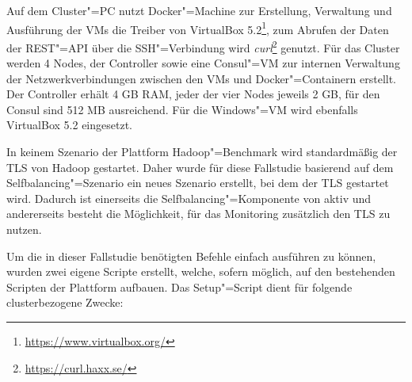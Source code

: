 
Auf dem Cluster"=PC nutzt Docker"=Machine zur Erstellung, Verwaltung und Ausführung der VMs die Treiber von VirtualBox 5.2\footnote{\url{https://www.virtualbox.org/}}, zum Abrufen der Daten der REST"=API über die SSH"=Verbindung wird \emph{curl}\footnote{\url{https://curl.haxx.se/}} genutzt.
Für das Cluster werden 4 Nodes, der Controller sowie eine Consul"=VM zur internen Verwaltung der Netzwerkverbindungen zwischen den VMs und Docker"=Containern erstellt.
Der Controller erhält 4 GB RAM, jeder der vier Nodes jeweils 2 GB, für den Consul sind 512 MB ausreichend.
Für die Windows"=VM wird ebenfalls VirtualBox 5.2 eingesetzt.

In keinem Szenario der Plattform Hadoop"=Benchmark wird standardmäßig der \ac{TLS} von Hadoop gestartet.
Daher wurde für diese Fallstudie basierend auf dem Selfbalancing"=Szenario ein neues Szenario erstellt, bei dem der \ac{TLS} gestartet wird.
Dadurch ist einerseits die Selfbalancing"=Komponente von \citeauthor{zhang2016} aktiv und andererseits besteht die Möglichkeit, für das Monitoring zusätzlich den \ac{TLS} zu nutzen.

Um die in dieser Fallstudie benötigten Befehle einfach ausführen zu können, wurden zwei eigene Scripte erstellt, welche, sofern möglich, auf den bestehenden Scripten der Plattform aufbauen.
Das Setup"=Script dient für folgende clusterbezogene Zwecke:

